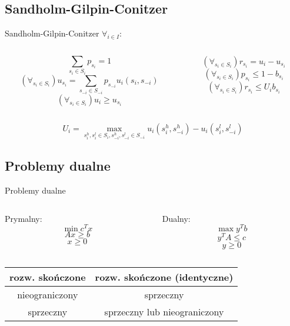 \documentclass[xcolor=x11names,compress]{beamer}
\renewcommand{\(}{\begin{columns}}
\renewcommand{\)}{\end{columns}}
\newcommand{\<}[1]{\begin{column}{#1}}
\renewcommand{\>}{\end{column}}
\begin{document}
\subsection{Sandholm-Gilpin-Conitzer}
\begin{frame}{Sandholm-Gilpin-Conitzer}
\LARGE $\forall_{i \in I}$:
\bigskip
\normalsize
\begin{columns}[c]
\begin{column}{.5\textwidth}
$$\sum_{{s_i} \in S_i} p_{s_i} = 1$$
$$(\forall_{s_i \in S_i}) u_{s_i} = \sum_{s_{-i} \in S_{-i}} p_{s_{-i}} u_i(s_i, s_{-i})$$
$$(\forall_{s_i \in S_i}) u_i \geq u_{s_i}$$
\end{column}
\begin{column}{.5\textwidth}
$$(\forall_{s_i \in S_i}) r_{s_i} = u_i - u_{s_i}$$
$$(\forall_{s_i \in S_i}) p_{s_i} \leq 1-b_{s_i}$$
$$(\forall_{s_i \in S_i}) r_{s_i} \leq U_i b_{s_i}$$
\end{column}
\end{columns}
\bigskip
$$U_i = \max_{s_i^h, s_i^l \in S_i, s_{-i}^h, s_{-i}^l \in S_{-i}} u_i(s_i^h, s_{-i}^h) - u_i(s_i^l, s_{-i}^l)$$
\end{frame}

\subsection{Problemy dualne}
\begin{frame}{Problemy dualne}
\begin{columns}[c]
\begin{column}{.5\textwidth}
\begin{center}
Prymalny:
$$\min c^{T}x$$
$$Ax \geq b$$
$$x \geq 0$$
\end{center}
\end{column}
\begin{column}{.5\textwidth}
\begin{center}
Dualny:
$$\max y^{T}b$$
$$y^{T}A \leq c$$
$$y \geq 0$$
\end{center}
\end{column}
\end{columns}
\begin{center}
\begin{tabular}{ | c c | }
\hline
rozw. skończone & rozw. skończone (identyczne) \\
\hline
nieograniczony  & sprzeczny                    \\
\hline
sprzeczny       & sprzeczny lub nieograniczony \\
\hline
\end{tabular}
\end{center}
\end{frame}
\end{document}
